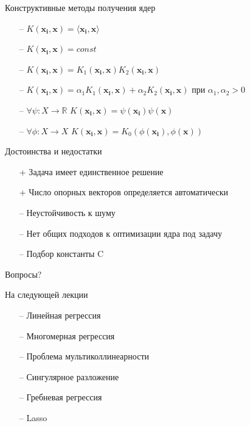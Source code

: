 \documentclass[12pt]{beamer}
\begin{document}
\begin{frame}{Конструктивные методы получения ядер}
	\begin{itemize}
		\item[--] $K(\mathbf{x_i}, \mathbf{x}) = \langle \mathbf{x_i}, \mathbf{x} \rangle$
		\item[--] $K(\mathbf{x_i}, \mathbf{x}) = const$
		\item[--] $K(\mathbf{x_i}, \mathbf{x}) = K_1(\mathbf{x_i}, \mathbf{x}) K_2(\mathbf{x_i}, \mathbf{x})$
		\item[--] $K(\mathbf{x_i}, \mathbf{x}) = \alpha_1 K_1(\mathbf{x_i}, \mathbf{x}) + \alpha_2 K_2(\mathbf{x_i}, \mathbf{x})$ при  $\alpha_1, \alpha_2 > 0$
		\item[--] $\forall \psi: X \rightarrow \mathbb{R}$ \hspace{5mm}$K(\mathbf{x_i}, \mathbf{x}) = \psi(\mathbf{x_i}) \psi(\mathbf{x})$
		\item[--] $\forall \phi: X \rightarrow X$ \hspace{5mm}$K(\mathbf{x_i}, \mathbf{x}) = K_0(\phi(\mathbf{x_i}),  \phi(\mathbf{x}))$
	\end{itemize}
\end{frame}

\begin{frame}{Достоинства и недостатки}
	\begin{itemize}[<+->]
		\item[+] Задача имеет единственное решение
		\item[+] Число опорных векторов определяется автоматически
	  \bigbreak
	
		\item[--] Неустойчивость к шуму
		\item[--] Нет общих подходов к оптимизации ядра под задачу
		\item[--] Подбор константы C
	\end{itemize}
\end{frame}

\begin{frame}[standout]
  Вопросы?
\end{frame}

\appendix

\begin{frame}{На следующей лекции}
	\begin{itemize}
    	\item[--] Линейная регрессия
    \item[--] Многомерная регрессия
    \item[--] Проблема мультиколлинеарности
    \item[--] Сингулярное разложение
    \item[--] Гребневая регрессия
    \item[--] Lasso    
	\end{itemize}
\end{frame}
\end{document}
